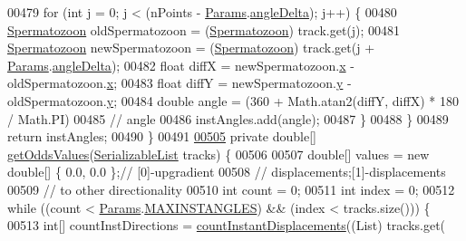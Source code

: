 \begin{DoxyCode}
{00479       \textcolor{keywordflow}{for} (\textcolor{keywordtype}{int} j = 0; j < (nPoints - \hyperlink{classdata_1_1_params}{Params}.\hyperlink{classdata_1_1_params_a93caa48162e34b2227a839ed71b4ed44}{angleDelta}); j++) \{
00480         \hyperlink{classdata_1_1_spermatozoon}{Spermatozoon} oldSpermatozoon = (\hyperlink{classdata_1_1_spermatozoon}{Spermatozoon}) track.get(j);
00481         \hyperlink{classdata_1_1_spermatozoon}{Spermatozoon} newSpermatozoon = (\hyperlink{classdata_1_1_spermatozoon}{Spermatozoon}) track.get(j + 
      \hyperlink{classdata_1_1_params}{Params}.\hyperlink{classdata_1_1_params_a93caa48162e34b2227a839ed71b4ed44}{angleDelta});
00482         \textcolor{keywordtype}{float} diffX = newSpermatozoon.\hyperlink{classdata_1_1_spermatozoon_ad0da36b2558901e21e7a30f6c227a45e}{x} - oldSpermatozoon.\hyperlink{classdata_1_1_spermatozoon_ad0da36b2558901e21e7a30f6c227a45e}{x};
00483         \textcolor{keywordtype}{float} diffY = newSpermatozoon.\hyperlink{classdata_1_1_spermatozoon_aa4f0d3eebc3c443f9be81bf48561a217}{y} - oldSpermatozoon.\hyperlink{classdata_1_1_spermatozoon_aa4f0d3eebc3c443f9be81bf48561a217}{y};
00484         \textcolor{keywordtype}{double} angle = (360 + Math.atan2(diffY, diffX) * 180 / Math.PI) %
00485                                                                                  \textcolor{comment}{// angle}
00486         instAngles.add(angle);
00487       \}
00488     \}
00489     \textcolor{keywordflow}{return} instAngles;
00490   \}
00491 
\hypertarget{_chemotaxis_8java_source_l00505}{}\hyperlink{classanalysis_1_1_chemotaxis_a02c2fbfd2097bca3933e285e6712a58d}{00505}   \textcolor{keyword}{private} \textcolor{keywordtype}{double}[] \hyperlink{classanalysis_1_1_chemotaxis_a02c2fbfd2097bca3933e285e6712a58d}{getOddsValues}(\hyperlink{classdata_1_1_serializable_list}{SerializableList} tracks) \{
00506 
00507     \textcolor{keywordtype}{double}[] values = \textcolor{keyword}{new} \textcolor{keywordtype}{double}[] \{ 0.0, 0.0 \};\textcolor{comment}{// [0]-upgradient}
00508                                                 \textcolor{comment}{// displacements;[1]-displacements}
00509                                                 \textcolor{comment}{// to other directionality}
00510     \textcolor{keywordtype}{int} count = 0;
00511     \textcolor{keywordtype}{int} index = 0;
00512     \textcolor{keywordflow}{while} ((count < \hyperlink{classdata_1_1_params}{Params}.\hyperlink{classdata_1_1_params_a11078ae453283411c72774c45caa7519}{MAXINSTANGLES}) && (index < tracks.size())) \{
00513       \textcolor{keywordtype}{int}[] countInstDirections = \hyperlink{classanalysis_1_1_chemotaxis_a668ad1c1240012d6fb70c1fac4a219be}{countInstantDisplacements}((List) tracks.get(
}
\end{DoxyCode}
